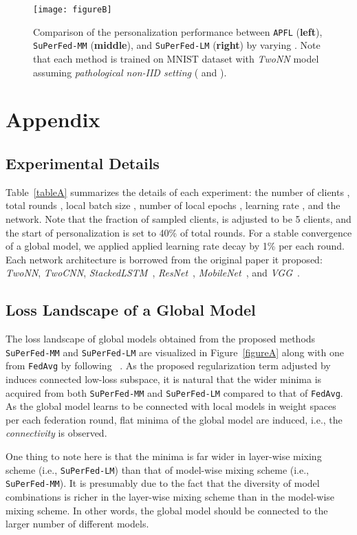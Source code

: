 \documentclass[sigconf]{acmart}
\begin{document}
\begin{figure*}[!htbp]
\centering
\texttt{[image: figureB]}
\caption{Comparison of the personalization performance between \texttt{APFL} (\textbf{left}), \texttt{SuPerFed-MM} (\textbf{middle}), and \texttt{SuPerFed-LM} (\textbf{right}) by varying . Note that each method is trained on MNIST dataset with \textit{TwoNN} model assuming \textit{pathological non-IID setting} ( and ).}
\label{figureB}
\end{figure*}

\section{Appendix}
\subsection{Experimental Details}
Table~\ref{tableA} summarizes the details of each experiment: the number of clients , total rounds , local batch size , number of local epochs , learning rate , and the network. Note that the fraction of sampled clients,  is adjusted to be 5 clients, and the start of personalization  is set to 40\% of total rounds. For a stable convergence of a global model, we applied applied learning rate decay by 1\% per each round. Each network architecture is borrowed from the original paper it proposed: \textit{TwoNN}, \textit{TwoCNN}, \textit{StackedLSTM}~\cite{mc+17}, \textit{ResNet}~\cite{resnet}, \textit{MobileNet}~\cite{mobilenet}, and \textit{VGG}~\cite{vgg}. 

\subsection{Loss Landscape of a Global Model} The loss landscape of global models obtained from the proposed methods \texttt{SuPerFed-MM} and \texttt{SuPerFed-LM} are visualized in Figure~\ref{figureA} along with one from \texttt{FedAvg} by following ~\cite{garipov+18}. As the proposed regularization term adjusted by  induces connected low-loss subspace, it is natural that the wider minima is acquired from both \texttt{SuPerFed-MM} and \texttt{SuPerFed-LM} compared to that of \texttt{FedAvg}. As the global model learns to be connected with local models in weight spaces per each federation round, flat minima of the global model are induced, i.e., the \textit{connectivity} is observed. 

One thing to note here is that the minima is far wider in layer-wise mixing scheme (i.e., \texttt{SuPerFed-LM}) than that of model-wise mixing scheme (i.e., \texttt{SuPerFed-MM}). It is presumably due to the fact that the diversity of model combinations is richer in the layer-wise mixing scheme than in the model-wise mixing scheme. In other words, the global model should be connected to the larger number of different models. 
\end{document}
